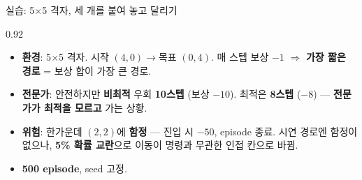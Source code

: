 \begin{frame}{실습: 5$\times$5 격자, 세 개를 붙여 놓고 달리기}
\begin{center}\begin{varwidth}{0.92\textwidth}
  \small
  \begin{itemize}
    \item \textbf{환경}: 5$\times$5 격자. 시작 $(4,0)\to$목표 $(0,4)$.
      매 스텝 보상 $-1$ $\Rightarrow$ \textbf{가장 짧은 경로} =
      보상 합이 가장 큰 경로.
    \item \textbf{전문가}: 안전하지만 \textbf{비최적} 우회
      \textbf{10스텝} (보상 $-10$). 최적은 \textbf{8스텝} ($-8$) —
      \textbf{전문가가 최적을 모르고} 가는 상황.
    \item \textbf{위험}: 한가운데 $(2,2)$에 \textbf{함정} — 진입 시
      $-50$, episode 종료. 시연 경로엔 함정이 없으나, \textbf{5\%
      확률 교란}으로 이동이 명령과 무관한 인접 칸으로 바뀜.
    \item \textbf{500 episode}, seed 고정.
  \end{itemize}
\end{varwidth}\end{center}
\end{frame}
